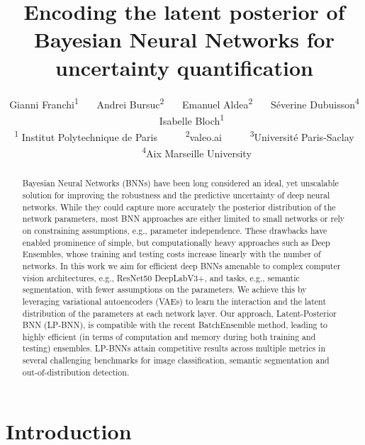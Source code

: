 \documentclass[10pt,twocolumn,letterpaper]{article}
\begin{document}
\title{Encoding the latent posterior of Bayesian Neural Networks for uncertainty quantification}


\author{
	Gianni Franchi\textsuperscript{1} \ \ \ 
	Andrei Bursuc\textsuperscript{2} \ \ \ 
	Emanuel Aldea\textsuperscript{2} \ \ \ 
	S\'{e}verine Dubuisson\textsuperscript{4} \ \ \ 
	Isabelle Bloch\textsuperscript{1} \\
	\small \textsuperscript{1} Institut Polytechnique de Paris 
	\ \ \ \ \ \textsuperscript{2}valeo.ai
	\ \ \ \ \ \textsuperscript{3}Universit\'{e} Paris-Saclay
    \ \ \ \ \ \textsuperscript{4}Aix Marseille University
}



\maketitle
\ificcvfinal\thispagestyle{empty}\fi

\begin{abstract}
Bayesian Neural Networks (BNNs) have been long considered an ideal, yet unscalable solution for improving the robustness and the predictive uncertainty of deep neural networks. While they 
could capture more accurately the posterior distribution of the network parameters, most BNN approaches are either limited to small networks or rely on constraining assumptions,
e.g., parameter independence. These drawbacks have enabled prominence of simple, but computationally heavy approaches such as Deep Ensembles, whose training and testing costs increase linearly with the number of networks. In this work we aim for efficient deep BNNs amenable to complex computer vision architectures, e.g., ResNet50 DeepLabV3+, and tasks, e.g., semantic segmentation, with fewer assumptions on the parameters. We achieve this by leveraging variational autoencoders (VAEs) to learn the interaction and the latent distribution of the parameters at each network layer. Our approach, Latent-Posterior BNN (LP-BNN), is compatible with the recent BatchEnsemble method, leading to highly efficient ({in terms of computation and} memory during both training and testing) ensembles. LP-BNNs attain competitive results across multiple metrics in several challenging benchmarks for image classification, semantic segmentation and out-of-distribution detection.
\end{abstract}

\section{Introduction}
\end{document}
